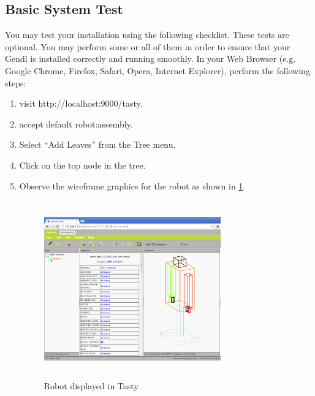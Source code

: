 \documentclass [11pt]{book}
\begin{document}
\subsection{Basic System Test}

\label{subsec:basicsystemtest}

You may test your installation using the following
checklist. These tests are optional. You may perform some or all of
them in order to ensure that your Gendl is installed correctly and
running smoothly. In your Web Browser (e.g. Google Chrome, Firefox,
Safari, Opera, Internet Explorer), perform the following steps:

\begin{enumerate}

\item visit http://localhost:9000/tasty.

\item accept default robot:assembly.

\item Select ``Add Leaves'' from the Tree menu.

\item Click on the top node in the tree.

\item Observe the wireframe graphics for the robot as shown in 
\ref{fig:tasty-robot}.

\begin{figure}
\begin{center}
\includegraphics[width=3in,height=3in]{../images/tasty-robot.png}
\end{center}

\caption{Robot displayed in Tasty}

\label{fig:tasty-robot}

\end{figure}


\end{enumerate}
\end{document}
